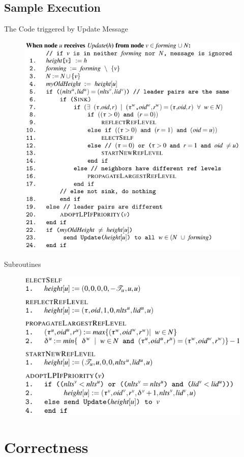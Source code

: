 \documentclass{beamer}
\begin{document}
\subsection{Sample Execution}

\begin{frame}{The Code triggered by Update Message}
\begin{figure}[h]
	\centering
	\includegraphics[width=0.5\linewidth]{tcode_update.png}
	\label{fig:figure1}
\end{figure}
\end{frame}

\begin{frame}{Subroutines}
\begin{figure}[h]
	\centering
	\includegraphics[width=0.8\linewidth]{subroutines.png}
	\label{fig:figure1}
\end{figure}
\end{frame}


\section{Correctness}
\end{document}
